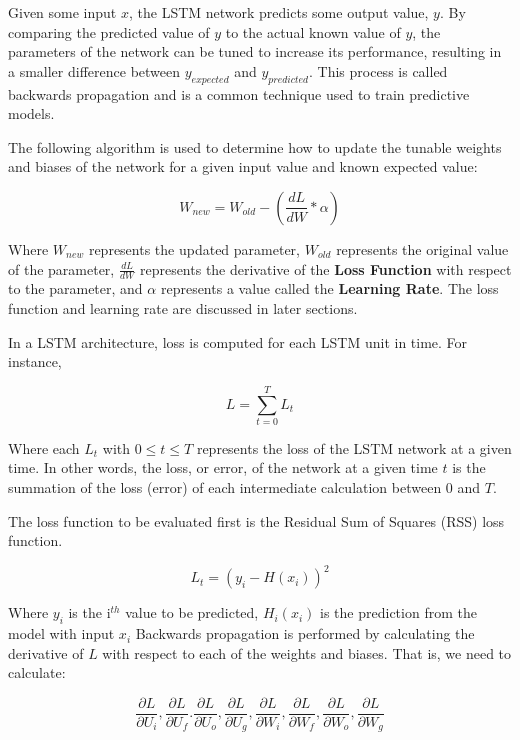 \documentclass[12pt]{article}
\begin{document}
Given some input $x$, the LSTM network predicts some output value, $y$. By
comparing the predicted value of $y$ to the actual known value of $y$, the
parameters of the network can be tuned to increase its performance, resulting
in a smaller difference between $y_{expected}$ and $y_{predicted}$. This
process is called backwards propagation and is a common technique used to train
predictive models.

The following algorithm is used to determine how to update the tunable weights
and biases of the network for a given input value and known expected value:

\begin{equation}
    W_{new} = W_{old} - (\frac{dL}{dW} * \alpha)
\end{equation}

Where $W_{new}$ represents the updated parameter, $W_{old}$ represents the
original value of the parameter, $\frac{dL}{dW}$ represents the derivative of
the \textbf{Loss Function} with respect to the parameter, and $\alpha$
represents a value called the \textbf{Learning Rate}. The loss function and
learning rate are discussed in later sections.

In a LSTM architecture, loss is computed for each LSTM unit in time. For
instance,

\begin{equation}
    L = \sum_{t=0}^{T}L_t
\end{equation}

Where each $L_t$ with $0 \le t \le T$ represents the loss of the LSTM network
at a given time. In other words, the loss, or error, of the network at a given
time $t$ is the summation of the loss (error) of each intermediate calculation
between 0 and $T$.

The loss function to be evaluated first is the Residual Sum of Squares (RSS)
loss function.

\begin{equation}
    L_t = (y_i - H(x_i))^2
\end{equation}

Where $y_i$ is the i$^{th}$ value to be predicted, $H_i(x_i)$ is the prediction
from the model with input $x_i$ Backwards propagation is performed by
calculating the derivative of $L$ with respect to each of the weights and
biases. That is, we need to calculate:

\begin{equation*}
    \frac{\partial L}{\partial U_i}, \frac{\partial L}{\partial U_f}. \frac{\partial L}{\partial U_o}, \frac{\partial L}{\partial U_g}, \frac{\partial L}{\partial W_i}, \frac{\partial L}{\partial W_f}, \frac{\partial L}{\partial W_o}, \frac{\partial L}{\partial W_g}
\end{equation*}
\end{document}
